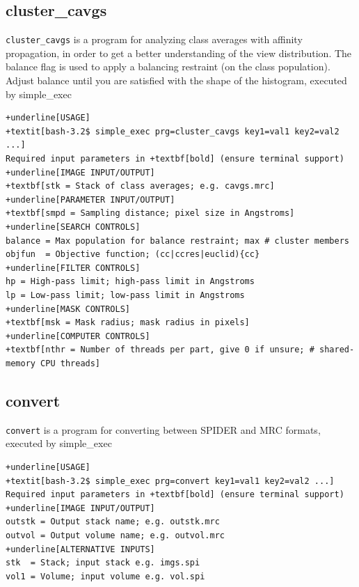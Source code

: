 \documentclass[a4paper,11pt]{article}
\newcommand{\prgname}[1]{\textcolor{NavyBlue}{\texttt{#1}}}
\begin{document}
\subsection{cluster\_cavgs}
\label{cluster_cavgs}
\prgname{cluster\_cavgs} is a program for analyzing class averages with affinity propagation, in order to get a better understanding of the view distribution. The balance flag is used to apply a balancing restraint (on the class population). Adjust balance until you are satisfied with the shape of the histogram, executed by simple\_exec
\begin{Verbatim}[commandchars=+\[\],fontsize=\small,breaklines=true]
+underline[USAGE]
+textit[bash-3.2$ simple_exec prg=cluster_cavgs key1=val1 key2=val2 ...]
Required input parameters in +textbf[bold] (ensure terminal support)
+underline[IMAGE INPUT/OUTPUT]
+textbf[stk = Stack of class averages; e.g. cavgs.mrc]
+underline[PARAMETER INPUT/OUTPUT]
+textbf[smpd = Sampling distance; pixel size in Angstroms]
+underline[SEARCH CONTROLS]
balance = Max population for balance restraint; max # cluster members
objfun  = Objective function; (cc|ccres|euclid){cc}
+underline[FILTER CONTROLS]
hp = High-pass limit; high-pass limit in Angstroms
lp = Low-pass limit; low-pass limit in Angstroms
+underline[MASK CONTROLS]
+textbf[msk = Mask radius; mask radius in pixels]
+underline[COMPUTER CONTROLS]
+textbf[nthr = Number of threads per part, give 0 if unsure; # shared-memory CPU threads]
\end{Verbatim}

\subsection{convert}
\label{convert}
\prgname{convert} is a program for converting between SPIDER and MRC formats, executed by simple\_exec
\begin{Verbatim}[commandchars=+\[\],fontsize=\small,breaklines=true]
+underline[USAGE]
+textit[bash-3.2$ simple_exec prg=convert key1=val1 key2=val2 ...]
Required input parameters in +textbf[bold] (ensure terminal support)
+underline[IMAGE INPUT/OUTPUT]
outstk = Output stack name; e.g. outstk.mrc
outvol = Output volume name; e.g. outvol.mrc
+underline[ALTERNATIVE INPUTS]
stk  = Stack; input stack e.g. imgs.spi
vol1 = Volume; input volume e.g. vol.spi
\end{Verbatim}
\end{document}
